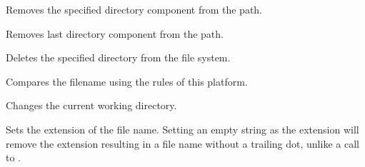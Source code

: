 \label{wxfilenameremovedir}


Removes the specified directory component from the path.




\label{wxfilenameremovelastdir}


Removes last directory component from the path.


\label{wxfilenamermdir}



Deletes the specified directory from the file system.


\label{wxfilenamesameas}


Compares the filename using the rules of this platform.


\label{wxfilenamesetcwd}



Changes the current working directory.


\label{wxfilenamesetext}


Sets the extension of the file name. Setting an empty string
as the extension will remove the extension resulting in a file 
name without a trailing dot, unlike a call to 
.



\label{wxfilenamesetemptyext}



